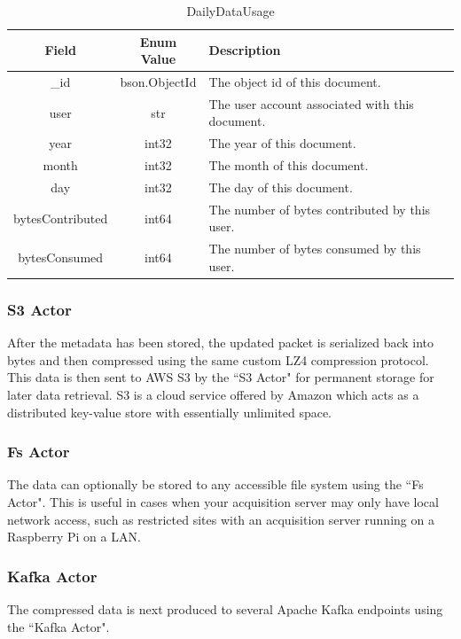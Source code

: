 \begin{table}[H]
	\centering
	\caption{DailyDataUsage}
	\begin{tabular}{|c|c| p{8cm} |}
		\hline
		Field & Enum Value & Description  \\
		\hline
		\_id & bson.ObjectId & The object id of this document. \\
		\hline
		user & str & The user account associated with this document. \\
		\hline
		year & int32 & The year of this document. \\
		\hline
		month & int32 & The month of this document. \\
		\hline
		day & int32 & The day of this document. \\
		\hline
		bytesContributed & int64 & The number of bytes contributed by this user. \\
		\hline
		bytesConsumed & int64 & The number of bytes consumed by this user. \\
		\hline
	\end{tabular}
	\label{table:DailyDataUsage}
\end{table}

\subsubsection{S3 Actor}
After the metadata has been stored, the updated packet is serialized back into bytes and then compressed using the same custom LZ4  compression protocol. This data is then sent to AWS S3 by the ``S3 Actor" for permanent storage for later data retrieval. S3 is a cloud service offered by Amazon which acts as a distributed key-value store with essentially unlimited space.


\subsubsection{Fs Actor}
The data can optionally be stored to any accessible file system using the ``Fs Actor". This is useful in cases when your acquisition server may only have local network access, such as restricted sites with an acquisition server running on a Raspberry Pi on a LAN\@.

\subsubsection{Kafka Actor}
The compressed data is next produced to several Apache Kafka endpoints using the ``Kafka Actor".

